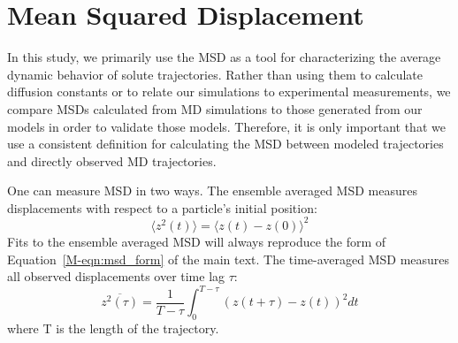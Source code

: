\documentclass{article}
\begin{document}

  \newpage
  
  \section{Mean Squared Displacement}\label{section:msd}
  
  In this study, we primarily use the MSD as a tool for characterizing the average
  dynamic behavior of solute trajectories. Rather than using them to calculate 
  diffusion constants or to relate our simulations to experimental measurements, we
  compare MSDs calculated from MD simulations to those generated from our models 
  in order to validate those models. Therefore, it is only important that we use a
  consistent definition for calculating the MSD between modeled trajectories and
  directly observed MD trajectories.

  One can measure MSD in two ways. The ensemble averaged MSD measures 
  displacements with respect to a particle's initial position:
  \begin{equation}
  \langle z^2(t) \rangle = \langle z(t) - z(0) \rangle^2
  \label{eqn:ensemble_msd}
  \end{equation}
  Fits to the ensemble averaged MSD will always reproduce the form of 
  Equation~\ref{M-eqn:msd_form} of the main text. The time-averaged MSD measures all observed 
  displacements over time lag $\tau$: 
  \begin{equation}
  \overline{z^2(\tau)} = \dfrac{1}{T - \tau}\int_{0}^{T - \tau} (z(t + \tau) - z(t))^2 dt
  \label{eqn:tamsd}
  \end{equation}
  where T is the length of the trajectory. 
  
\end{document}
